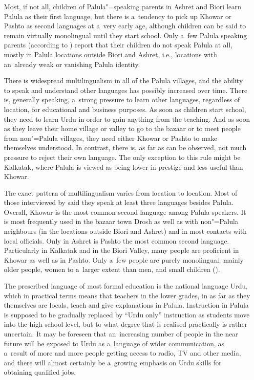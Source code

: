 Most, if not all, children of Palula"=speaking parents in Ashret and Biori learn Palula as their first language, but there is a~tendency to pick up Khowar or Pashto as second languages at a~very early age, although children can be said to remain virtually monolingual until they start school. Only a~few Palula speaking parents (according to \citealt{decker1992a}) report that their children do not speak Palula at all, mostly in Palula locations outside Biori and Ashret, i.e., locations with an~already weak or vanishing Palula identity. 


There is widespread multilingualism in all of the Palula villages, and the ability to speak and understand other languages has possibly increased over time. There is, generally speaking, a~strong pressure to learn other languages, regardless of location, for educational and business purposes. As soon as children start school, they need to learn Urdu in order to gain anything from the teaching. And as soon as they leave their home village or valley to go to the bazaar or to meet people from non"=Palula villages, they need either Khowar or Pashto to make themselves understood. In contrast, there is, as far as can be observed, not much pressure to reject their own language. The only exception to this rule might be Kalkatak, where Palula is viewed as being lower in prestige and less useful than Khowar.

\largerpage
The exact pattern of multilingualism varies from location to location. Most of those interviewed by \citet{decker1992a} said they speak at least three languages besides Palula. Overall, Khowar is the most common second language among Palula speakers. It is most frequently used in the bazaar town Drosh as well as with non"=Palula neighbours (in the locations outside Biori and Ashret) and in most contacts with local officials. Only in Ashret is Pashto the most common second language. Particularly in Kalkatak and in the Biori Valley, many people are proficient in Khowar as well as in Pashto. Only a~few people are purely monolingual: mainly older people, women to a~larger extent than men, and small children (\citealt{decker1992a}). 


The prescribed language of most formal education is the national language Urdu, which in practical terms means that teachers in the lower grades, in as far as they themselves are locals, teach and give explanations in Palula. Instruction in Palula is supposed to be gradually replaced by ``Urdu only'' instruction as students move into the high school level, but to what degree that is realised practically is rather uncertain. It may be foreseen that an~increasing number of people in the near future will be exposed to Urdu as a~language of wider communication, as a~result of more and more people getting access to radio, TV and other media, and there will almost certainly be a~growing emphasis on Urdu skills for obtaining qualified jobs.


